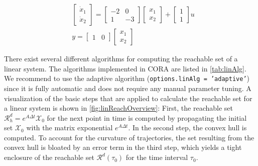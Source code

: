 \begin{center}
\begin{minipage}[t]{0.48\textwidth}
	\begin{equation*}
\begin{split}
	& \begin{bmatrix} \dot x_1 \\ \dot x_2 \end{bmatrix} = \begin{bmatrix} -2 & 0 \\ 1 & -3 \end{bmatrix} \begin{bmatrix} x_1 \\ x_2 \end{bmatrix} + \begin{bmatrix} 1 \\ 1 \end{bmatrix} u \\
	& y = \begin{bmatrix} 1 & 0 \end{bmatrix} \begin{bmatrix} x_1 \\ x_2 \end{bmatrix} 
\end{split}
\end{equation*}
\end{minipage}
\begin{minipage}[t]{0.48\textwidth}
	\vspace{5pt}
	\footnotesize
	
\end{minipage}
\end{center}


There exist several different algorithms for computing the reachable set of a linear system. The algorithms implemented in CORA are listed in \cref{tab:linAlg}. We recommend to use the adaptive algorithm (\texttt{options.linAlg = 'adaptive'}) since it is fully automatic and does not require any manual parameter tuning. A visualization of the basic steps that are applied to calculate the reachable set for a linear system is shown in \cref{fig:linReachOverview}: First, the reachable set $\mathcal{R}_h^d = e^{A \Delta t} \mathcal{X}_0$ for the next point in time is computed by propagating the initial set $\mathcal{X}_0$ with the matrix exponential $e^{A \Delta t}$. In the second step, the convex hull is computed. To account for the curvature of trajectories, the set resulting from the convex hull is bloated by an error term in the third step, which yields a tight enclosure of the reachable set $\mathcal{R}^d(\tau_0)$ for the time interval $\tau_0$.

